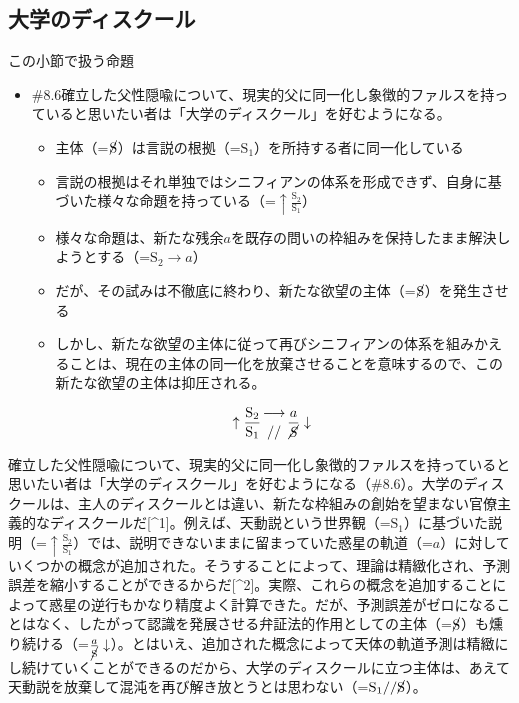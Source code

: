 \subsection{大学のディスクール}\label{ux5927ux5b66ux306eux30c7ux30a3ux30b9ux30afux30fcux30eb}

\begin{note}{この小節で扱う命題}
  \begin{itemize}
    \tightlist
    \item{\#8.6}確立した父性隠喩について、現実的父に同一化し象徴的ファルスを持っていると思いたい者は「大学のディスクール」を好むようになる。
      \begin{itemize}
        \tightlist
        \item 主体（=$\cancel{\textrm{S}}$）は言説の根拠（=$\textrm{S}_1$）を所持する者に同一化している
        \item 言説の根拠はそれ単独ではシニフィアンの体系を形成できず、自身に基づいた様々な命題を持っている（=$\uparrow\frac{\textrm{S}_2}{\textrm{S}_1}$）
        \item 様々な命題は、新たな残余$a$を既存の問いの枠組みを保持したまま解決しようとする（=$\textrm{S}_2\rightarrow a$）
        \item だが、その試みは不徹底に終わり、新たな欲望の主体（=$\cancel{\textrm{S}}$）を発生させる
        \item しかし、新たな欲望の主体に従って再びシニフィアンの体系を組みかえることは、現在の主体の同一化を放棄させることを意味するので、この新たな欲望の主体は抑圧される。
      \end{itemize}

$$
\uparrow\frac{\mathrm{S_2}}{\mathrm{S_1}}\genfrac{}{}{0pt}{}{\longrightarrow}{//}\frac{a}{\mathrm{\cancel{S}}}\downarrow
$$
  \end{itemize}
\end{note}

確立した父性隠喩について、現実的父に同一化し象徴的ファルスを持っていると思いたい者は「大学のディスクール」を好むようになる（\#8.6）。大学のディスクールは、主人のディスクールとは違い、新たな枠組みの創始を望まない官僚主義的なディスクールだ{[}\^{}1{]}。例えば、天動説という世界観（=\(\textrm{S}_1\)）に基づいた説明（=\(\uparrow\frac{\textrm{S}_2}{\textrm{S}_1}\)）では、説明できないままに留まっていた惑星の軌道（=\(a\)）に対していくつかの概念が追加された。そうすることによって、理論は精緻化され、予測誤差を縮小することができるからだ{[}\^{}2{]}。実際、これらの概念を追加することによって惑星の逆行もかなり精度よく計算できた。だが、予測誤差がゼロになることはなく、したがって認識を発展させる弁証法的作用としての主体（=\(\cancel{\textrm{S}}\)）も燻り続ける（=\(\frac{a}{\cancel{\textrm{S}}}\downarrow\)）。とはいえ、追加された概念によって天体の軌道予測は精緻にし続けていくことができるのだから、大学のディスクールに立つ主体は、あえて天動説を放棄して混沌を再び解き放とうとは思わない（=\(\textrm{S}_1//\cancel{\textrm{S}}\)）。

